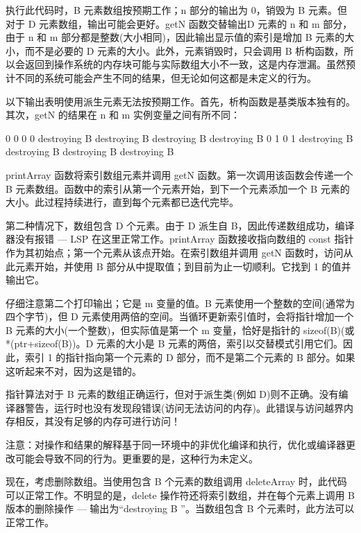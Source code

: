 执行此代码时，B 元素数组按预期工作；n 部分的输出为 0，销毁为 B 元素。但对于 D 元素数组，输出可能会更好。getN 函数交替输出D 元素的 n 和 m 部分，由于 n 和 m 部分都是整数(大小相同)，因此输出显示值的索引是增加 B 元素的大小，而不是必要的 D 元素的大小。此外，元素销毁时，只会调用 B 析构函数，所以会返回到操作系统的内存块可能与实际数组大小不一致，这是内存泄漏。虽然预计不同的系统可能会产生不同的结果，但无论如何这都是未定义的行为。

以下输出表明使用派生元素无法按预期工作。首先，析构函数是基类版本独有的。其次，getN 的结果在 n 和 m 实例变量之间有所不同：

\begin{shell}
0
0
0
0
destroying B
destroying B
destroying B
destroying B
0
1
0
1
destroying B
destroying B
destroying B
destroying B
\end{shell}


printArray 函数将索引数组元素并调用 getN 函数。第一次调用该函数会传递一个 B 元素数组。函数中的索引从第一个元素开始，到下一个元素添加一个 B 元素的大小。此过程持续进行，直到每个元素都已迭代完毕。

第二种情况下，数组包含 D 个元素。由于 D 派生自 B，因此传递数组成功，编译器没有报错 — LSP 在这里正常工作。printArray 函数接收指向数组的 const 指针作为其初始点；第一个元素从该点开始。在索引数组并调用 getN 函数时，访问从此元素开始，并使用 B 部分从中提取值；到目前为止一切顺利。它找到 1 的值并输出它。

仔细注意第二个打印输出；它是 m 变量的值。B 元素使用一个整数的空间(通常为四个字节)，但 D 元素使用两倍的空间。当循环更新索引值时，会将指针增加一个 B 元素的大小(一个整数)，但实际值是第一个 m 变量，恰好是指针的 sizeof(B)(或*(ptr+sizeof(B))。D 元素的大小是 B 元素的两倍，索引以交替模式引用它们。因此，索引 1 的指针指向第一个元素的 D 部分，而不是第二个元素的 B 部分。如果这听起来不对，因为这是错的。

指针算法对于 B 元素的数组正确运行，但对于派生类(例如 D)则不正确。没有编译器警告，运行时也没有发现段错误(访问无法访问的内存)。此错误与访问越界内存相反，其没有足够的内存可进行访问！

注意：对操作和结果的解释基于同一环境中的非优化编译和执行，优化或编译器更改可能会导致不同的行为。更重要的是，这种行为未定义。

现在，考虑删除数组。当使用包含 B 个元素的数组调用 deleteArray 时，此代码可以正常工作。不明显的是，delete 操作符还将索引数组，并在每个元素上调用 B 版本的删除操作 — 输出为“destroying B ”。当数组包含 B 个元素时，此方法可以正常工作。

